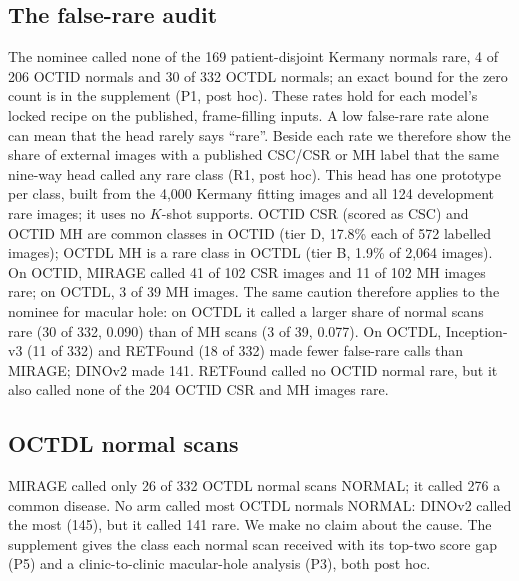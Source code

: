 \documentclass[conference]{IEEEtran}
\begin{document}
\subsection{The false-rare audit}
The nominee called none of the 169 patient-disjoint Kermany normals rare, 4 of 206 OCTID normals and 30 of 332 OCTDL normals; an exact bound for the zero count is in the supplement (P1, post hoc). These rates hold for each model's locked recipe on the published, frame-filling inputs.
A low false-rare rate alone can mean that the head rarely says ``rare''. Beside each rate we therefore show the share of external images with a published CSC/CSR or MH label that the same nine-way head called any rare class (R1, post hoc). This head has one prototype per class, built from the 4,000 Kermany fitting images and all 124 development rare images; it uses no $K$-shot supports. OCTID CSR (scored as CSC) and OCTID MH are common classes in OCTID (tier D, 17.8\% each of 572 labelled images); OCTDL MH is a rare class in OCTDL (tier B, 1.9\% of 2,064 images).
On OCTID, MIRAGE called 41 of 102 CSR images and 11 of 102 MH images rare; on OCTDL, 3 of 39 MH images. The same caution therefore applies to the nominee for macular hole: on OCTDL it called a larger share of normal scans rare (30 of 332, 0.090) than of MH scans (3 of 39, 0.077). On OCTDL, Inception-v3 (11 of 332) and RETFound (18 of 332) made fewer false-rare calls than MIRAGE; DINOv2 made 141. RETFound called no OCTID normal rare, but it also called none of the 204 OCTID CSR and MH images rare.

\subsection{OCTDL normal scans}
MIRAGE called only 26 of 332 OCTDL normal scans NORMAL; it called 276 a common disease. No arm called most OCTDL normals NORMAL: DINOv2 called the most (145), but it called 141 rare. We make no claim about the cause. The supplement gives the class each normal scan received with its top-two score gap (P5) and a clinic-to-clinic macular-hole analysis (P3), both post hoc.
\end{document}
